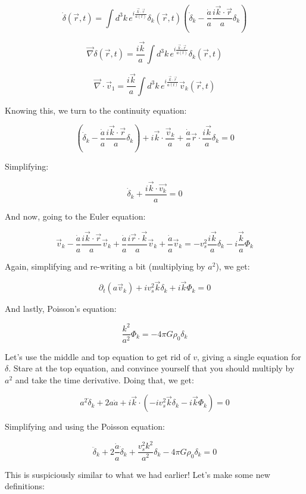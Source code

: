 \documentclass{article}
\newcommand{\be}{\begin{equation}}
\newcommand{\ee}{\end{equation}}
\begin{document}
\be
\dot{\delta}(\vec{r},t) = \int d^3 k \, e^{i\frac{\vec{k} \cdot \vec{r}}{a(t)}}\delta_k(\vec{r},t) \left(\dot{\delta}_k - \frac{\dot{a}}{a} \frac{i\vec{k}\cdot\vec{r}}{a}\delta_k\right)
\ee

\be
\vec{\nabla} \delta(\vec{r},t) = \frac{i\vec{k}}{a}\int d^3 k \, e^{i\frac{\vec{k} \cdot \vec{r}}{a(t)}}\delta_k(\vec{r},t)
\ee

\be
\vec{\nabla} \cdot \vec{v}_1 = \frac{i\vec{k}}{a}\int d^3 k \, e^{i\frac{\vec{k} \cdot \vec{r}}{a(t)}} \vec{v}_k(\vec{r},t)
\ee

Knowing this, we turn to the continuity equation:

\be
\left(\dot{\delta}_k - \frac{\dot{a}}{a} \frac{i\vec{k}\cdot\vec{r}}{a}\delta_k\right) + i\vec{k}\cdot \frac{\vec{v}_k}{a} + \frac{\dot{a}}{a} \vec{r} \cdot \frac{i \vec{k}}{a} \delta_k = 0
\ee

Simplifying:

\be
\boxed{\dot{\delta}_k + \frac{i \vec{k} \cdot \vec{v_k}}{a} = 0 }
\ee

And now, going to the Euler equation:

\be
\vec{v}_k - \frac{\dot{a}}{a}\frac{i \vec{k} \cdot \vec{r}}{a}\vec{v}_k + \frac{\dot{a}}{a} \frac{i\vec{r}\cdot\vec{k}}{a}\vec{v}_k + \frac{\dot{a}}{a}\vec{v}_k = -v_s^2 \frac{i\vec{k}}{a}\delta_k - i \frac{\vec{k}}{a} \Phi_k
\ee

Again, simplifying and re-writing a bit (multiplying by $a^2$), we get:

\be
\boxed{\partial_t \left(a \vec{v}_k\right) + i v_s^2 \vec{k} \delta_k + i \vec{k} \Phi_k = 0}
\ee

And lastly, Poisson's equation:

\be
\boxed{\frac{k^2}{a^2} \Phi_k = - 4\pi G\rho_0 \delta_k}
\ee

Let's use the middle and top equation to get rid of $v$, giving a single equation for $\delta$. Stare at the top equation, and convince yourself that you should multiply by $a^2$ and take the time derivative. Doing that, we get:

\be
a^2 \ddot{\delta}_k + 2a \dot{a} + i\vec{k} \cdot \left(-iv_s^2 \vec{k} \delta_k - i\vec{k} \Phi_k\right) = 0
\ee

Simplifying and using the Poisson equation:

\be
\ddot{\delta}_k + 2\frac{\dot{a}}{a} \dot{\delta}_k + \frac{v_s^2 k^2}{a^2} \delta_k - 4\pi G \rho_0 \delta_k = 0
\ee

This is suspiciously similar to what we had earlier! Let's make some new definitions:
\end{document}
